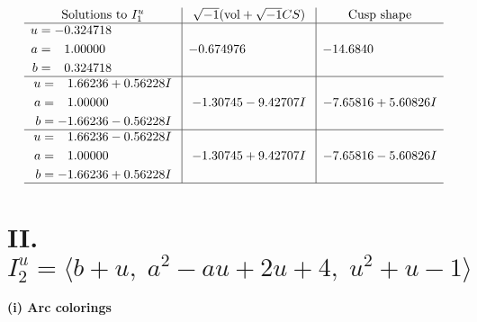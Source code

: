 \documentclass[1p]{elsarticle_modified}
\theoremstyle{definition}
\newcommand{\I}{\sqrt{-1}}
\begin{document}
$$\begin{array}{c|c|c}  
\text{Solutions to }I^u_{1}& \I (\text{vol} + \sqrt{-1}CS) & \text{Cusp shape}\\
 \hline 
\begin{aligned}
u &= -0.324718\phantom{ +0.000000I} \\
a &= \phantom{-}1.00000\phantom{ +0.000000I} \\
b &= \phantom{-}0.324718\phantom{ +0.000000I}\end{aligned}
 & -0.674976\phantom{ +0.000000I} & -14.6840\phantom{ +0.000000I} \\ \hline\begin{aligned}
u &= \phantom{-}1.66236 + 0.56228 I \\
a &= \phantom{-}1.00000\phantom{ +0.000000I} \\
b &= -1.66236 - 0.56228 I\end{aligned}
 & -1.30745 - 9.42707 I & -7.65816 + 5.60826 I \\ \hline\begin{aligned}
u &= \phantom{-}1.66236 - 0.56228 I \\
a &= \phantom{-}1.00000\phantom{ +0.000000I} \\
b &= -1.66236 + 0.56228 I\end{aligned}
 & -1.30745 + 9.42707 I & -7.65816 - 5.60826 I\\
 \hline 
 \end{array}$$\newpage\newpage\renewcommand{\arraystretch}{1}
\centering \section*{II. $I^u_{2}= \langle b+u,\;a^2- a u+2 u+4,\;u^2+u-1 \rangle$}
\flushleft \textbf{(i) Arc colorings}\\
\end{document}
